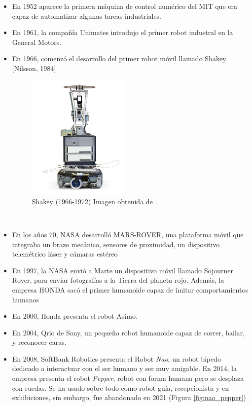 \begin {itemize}
	\item En 1952 aparece la primera máquina de control numérico del MIT que era capaz de automatizar algunas tareas industriales.
	\item En 1961, la compañía Unimates introdujo el primer robot industral en la General Motors.
	\item En 1966, comenzó el desarrollo del primer robot móvil llamado Shakey [Nilsson, 1984]
	\begin{figure} [H]
	\begin{center}
	\includegraphics[width=5cm]{imagenes/cap1/shakey.jpg}
	\end{center}
	\caption[Shakey (1966-1972)]{Shakey (1966-1972) Imagen obtenida de \cite{shakey-the-robot}.}
	\label{fig:shakey}
	\end{figure}\
	\item En los años 70, NASA desarrolló MARS-ROVER, una plataforma móvil que integraba un brazo mecánico, sensores de proximidad, un dispositivo telemétrico láser y cámaras estéreo
	\item En 1997, la NASA envió a Marte un dispositivo móvil llamado Sojourner Rover, para enviar fotografías a la Tierra del planeta rojo. Además, la empresa HONDA sacó el primer humanoide capaz de imitar comportamientos humanos
	\item En 2000, Honda presenta el robot Asimo.
	\item En 2004, Qrio de Sony, un pequeño robot humanoide capaz de correr, bailar, y reconocer caras.
	\item En 2008, SoftBank Robotics presenta el Robot \textit{Nao}, un robot bípedo dedicado a interactuar con el ser humano y ser muy amigable. En 2014, la empresa presenta el robot \textit{Pepper}, robot con forma humana pero se desplaza con ruedas. Se ha usado sobre todo como robot guía, recepcionista y en exhibiciones, sin embargo, fue abandonado en 2021 (Figura \ref{fig:nao_pepper})

\end{itemize}
